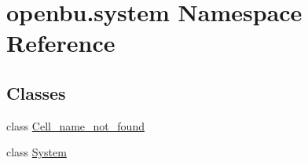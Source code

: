 \hypertarget{namespaceopenbu_1_1system}{}\section{openbu.\+system Namespace Reference}
\label{namespaceopenbu_1_1system}
\subsection*{Classes}
\begin{DoxyCompactItemize}
\item 
class \mbox{\hyperlink{classopenbu_1_1system_1_1_cell__name__not__found}{Cell\+\_\+name\+\_\+not\+\_\+found}}
\item 
class \mbox{\hyperlink{classopenbu_1_1system_1_1_system}{System}}
\end{DoxyCompactItemize}
